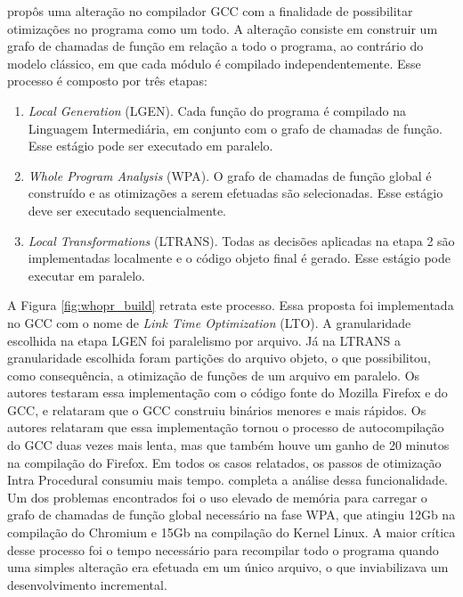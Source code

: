 \cite{whoprgoogle} propôs uma alteração no
compilador GCC com a finalidade
de possibilitar otimizações no programa como um todo. A alteração consiste
em construir um grafo de chamadas de função em relação a todo o programa,
ao contrário do modelo clássico, em que cada módulo é compilado independentemente.
Esse processo é composto por três etapas:
\begin{enumerate}
    \item \textit{Local Generation } (LGEN). Cada função do programa é compilado
        na Linguagem Intermediária, em conjunto com o grafo de chamadas de função.
        Esse estágio pode ser executado em paralelo.

    \item \textit{Whole Program Analysis} (WPA). O grafo de chamadas de função global
        é construído e as otimizações a serem efetuadas são selecionadas. Esse estágio
        deve ser executado sequencialmente.

    \item \textit{Local Transformations} (LTRANS). Todas as decisões aplicadas na
        etapa 2 são implementadas localmente e o código objeto final é gerado.
        Esse estágio pode executar em paralelo.
\end{enumerate}

A Figura \ref{fig:whopr_build} retrata este processo. Essa proposta foi implementada
no GCC \citep{glek2010optimizing} com o nome de
\textit{Link Time Optimization} (LTO). A granularidade
escolhida na etapa LGEN foi paralelismo por arquivo. Já na LTRANS a granularidade
escolhida foram partições do arquivo objeto, o que possibilitou, como consequência, a otimização de
funções de um arquivo em paralelo. Os autores testaram essa implementação com o
código fonte do Mozilla Firefox e do GCC, e relataram que o GCC construiu
binários menores e mais rápidos. Os autores relataram que essa implementação tornou
o processo de autocompilação do GCC duas vezes mais lenta,
mas que também houve um ganho de 20 minutos na compilação do Firefox. Em todos os
casos relatados, os passos de otimização Intra Procedural consumiu mais tempo.
\cite{livska2014optimizing} completa a análise dessa funcionalidade.
Um dos problemas encontrados foi o uso elevado de memória para carregar o grafo de
chamadas de função global necessário na fase WPA, que atingiu 12Gb na compilação do
Chromium e 15Gb na compilação do Kernel Linux. A maior crítica desse processo
foi o tempo necessário para recompilar todo o programa quando uma simples alteração
era efetuada em um único arquivo, o que inviabilizava um desenvolvimento incremental.

